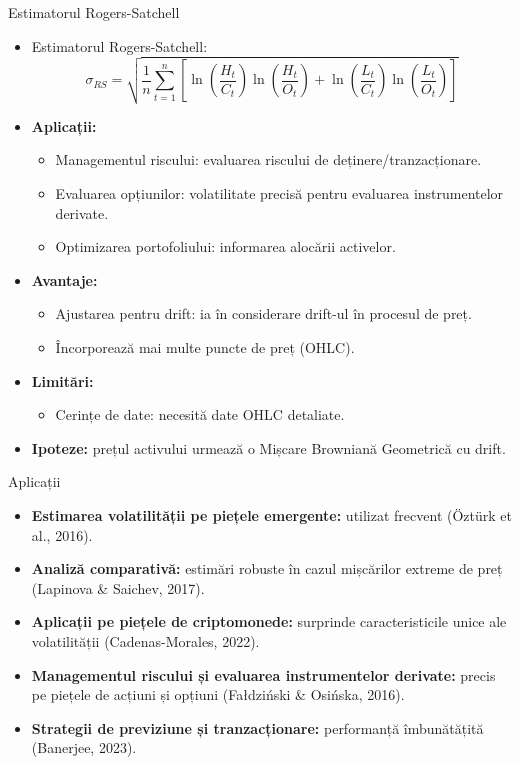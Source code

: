 \documentclass[9pt, aspectratio=169, t]{beamer}
\theoremstyle{definition}
\begin{document}
\begin{frame}{Estimatorul Rogers-Satchell}
\begin{itemize}
    \item Estimatorul Rogers-Satchell:
    \[
    \sigma_{RS} = \sqrt{\frac{1}{n}\sum_{t=1}^{n}\left[\ln\!\left(\frac{H_t}{C_t}\right)\ln\!\left(\frac{H_t}{O_t}\right) + \ln\!\left(\frac{L_t}{C_t}\right)\ln\!\left(\frac{L_t}{O_t}\right)\right]}
    \]
    \item \textbf{Aplicații:}
    \begin{itemize}
        \item Managementul riscului: evaluarea riscului de deținere/tranzacționare.
        \item Evaluarea opțiunilor: volatilitate precisă pentru evaluarea instrumentelor derivate.
        \item Optimizarea portofoliului: informarea alocării activelor.
    \end{itemize}
    \item \textbf{Avantaje:}
    \begin{itemize}
        \item Ajustarea pentru drift: ia în considerare drift-ul în procesul de preț.
        \item Încorporează mai multe puncte de preț (OHLC).
    \end{itemize}
    \item \textbf{Limitări:}
    \begin{itemize}
        \item Cerințe de date: necesită date OHLC detaliate.
    \end{itemize}
    \item \textbf{Ipoteze:} prețul activului urmează o Mișcare Browniană Geometrică cu drift.
\end{itemize}
\end{frame}

\begin{frame}{Aplicații}
\begin{itemize}
    \item \textbf{Estimarea volatilității pe piețele emergente:} utilizat frecvent (\"{O}zt\"{u}rk et al., 2016).
    \item \textbf{Analiză comparativă:} estimări robuste în cazul mișcărilor extreme de preț (Lapinova \& Saichev, 2017).
    \item \textbf{Aplicații pe piețele de criptomonede:} surprinde caracteristicile unice ale volatilității (Cadenas-Morales, 2022).
    \item \textbf{Managementul riscului și evaluarea instrumentelor derivate:} precis pe piețele de acțiuni și opțiuni (Fa{\l}dzi\'{n}ski \& Osi\'{n}ska, 2016).
    \item \textbf{Strategii de previziune și tranzacționare:} performanță îmbunătățită (Banerjee, 2023).
\end{itemize}
\end{frame}
\end{document}
